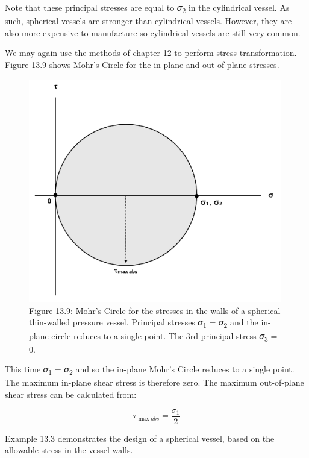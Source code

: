 \documentclass[
  letterpaper,
  DIV=11,
  numbers=noendperiod]{scrreprt}
\begin{document}
Note that these principal stresses are equal to 𝜎\textsubscript{2} in
the cylindrical vessel. As such, spherical vessels are stronger than
cylindrical vessels. However, they are also more expensive to
manufacture so cylindrical vessels are still very common.

We may again use the methods of chapter 12 to perform stress
transformation. Figure 13.9 shows Mohr's Circle for the in-plane and
out-of-plane stresses.

\begin{figure}[H]

{\centering \includegraphics[width=4.35417in,height=\textheight]{images/CH13 PNGs/figure 13.9.png}

}

\caption{Figure 13.9: Mohr's Circle for the stresses in the walls of a
spherical thin-walled pressure vessel. Principal stresses
𝜎\textsubscript{1} = 𝜎\textsubscript{2} and the in-plane circle reduces
to a single point. The 3rd principal stress 𝜎\textsubscript{3} = 0.}

\end{figure}%

This time 𝜎\textsubscript{1} = 𝜎\textsubscript{2} and so the in-plane
Mohr's Circle reduces to a single point. The maximum in-plane shear
stress is therefore zero. The maximum out-of-plane shear stress can be
calculated from:

\[
\tau_{\max a b s}=\frac{\sigma_1}{2}
\]

Example 13.3 demonstrates the design of a spherical vessel, based on the
allowable stress in the vessel walls.
\end{document}
